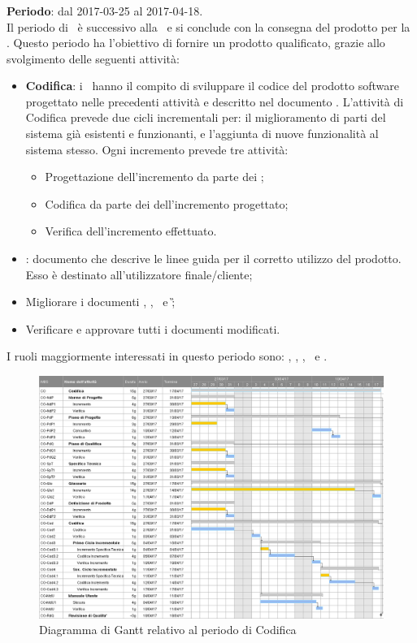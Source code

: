 		\subsubsection{\CO}
		\textbf{Periodo}: dal 2017-03-25 al 2017-04-18.\\
		Il periodo di \CO\ è successivo alla \PD\ e si conclude con la consegna del prodotto per la \RQ. Questo periodo ha l'obiettivo di fornire un prodotto qualificato, grazie allo svolgimento delle seguenti attività:
		\begin{itemize}
			\item \textbf{Codifica}: i \textit{\Progrs}\ hanno il compito di sviluppare il codice del prodotto software progettato nelle precedenti attività e descritto nel documento \DDP. L’attività di Codifica prevede due cicli incrementali per: il miglioramento
			di parti del sistema già esistenti e funzionanti, e l’aggiunta di nuove funzionalità al sistema stesso.
			Ogni incremento prevede tre attività:
			\begin{itemize}
				\item Progettazione dell’incremento da parte dei \textit{\Progs};
				\item Codifica da parte dei \textit{\Progrs} dell’incremento progettato;
				\item Verifica dell’incremento effettuato.
			\end{itemize}
			\item \textit{\MU}: documento che descrive le linee guida per il corretto utilizzo del prodotto. Esso è destinato all’utilizzatore finale/cliente;
			\item  Migliorare i documenti \NdP, \PdP, \PdQ\ e \G;
			\item Verificare e approvare tutti i documenti modificati.
		\end{itemize}
		I ruoli maggiormente interessati in questo periodo sono: \textit{\Amm}, \textit{\Res}, \textit{\Prog}, \textit{\Progr}\ e \textit{\Ver}.
		
		\begin{figure}[H]
			\centering
			\includegraphics[scale=0.40]{img/ganttnetbreak5.png}
			\caption{Diagramma di Gantt relativo al periodo di Codifica}
		\end{figure}
		
